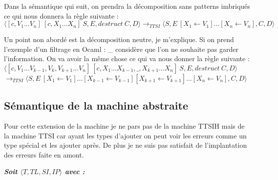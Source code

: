 \documentclass[10pt,a4paper]{report}
\begin{document}
	
	Dans la sémantique qui suit, on prendra la décomposition sans patterns imbriqués ce qui nous donnera la règle suivante : 
	\smallbreak
	$\langle [c,V_{1}...V_{n}]~[c,X_{1}...X_{n}]~S,E,destruct~C,D\rangle
	\longrightarrow_{TTSI} \langle S,E~[X_{1} \leftarrow V_{1}]...[X_{n} \leftarrow V_{n}],C,D\rangle$ 
	\bigbreak
	
	
	Un point non abordé est la décomposition neutre, je m'explique. Si on prend l'exemple d'un filtrage en Ocaml : \_ considère que l'on ne souhaite pas garder l'information. On va avoir la même chose ce qui va nous donner la règle suivante :
	\smallbreak
	$\langle [c,V_{1}...V_{k-1},V_{k},V_{k+1}...V_{n}]~[c,X_{1}...X_{k-1},\_,X_{k+1}...X_{n}]~S,E,destruct~C,D\rangle$
	\smallbreak
	$\longrightarrow_{TTSI} \langle S,E~[X_{1} \leftarrow V_{1}]...[X_{k-1} \leftarrow V_{k-1}][X_{k+1} \leftarrow V_{k+1}]...[X_{n} \leftarrow V_{n}],C,D\rangle$
	\newpage
	
	\subsection{Sémantique de la machine abstraite}
	
	Pour cette extension de la machine je ne pars pas de la machine TTSIH mais de la machine TTSI car ayant les types d'ajouter on peut voir les erreurs comme un type spécial et les ajouter après. De plus je ne suis pas satisfait de l'implantation des erreurs faite en amont.
	\bigbreak
	
	
	\textbf{\textit{Soit $\langle T,TL,SI,IP\rangle$ avec :}}
	
\end{document}
